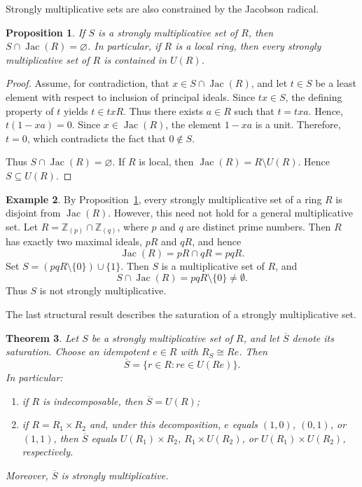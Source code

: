 \documentclass[11pt]{amsart}
\newtheorem{theorem}{Theorem}[section]
\newtheorem{proposition}[theorem]{Proposition}
\theoremstyle{definition}
\newtheorem{example}[theorem]{Example}
\theoremstyle{remark}
\newcommand{\Jac}{\operatorname{Jac}}
\begin{document}
Strongly multiplicative sets are also constrained by the Jacobson radical.

\begin{proposition}\label{prop:jac}
If $S$ is a strongly multiplicative set of $R$, then $S \cap \Jac(R)=\varnothing$. In particular, if $R$ is a local ring, then every strongly multiplicative set of $R$ is contained in $U(R)$.
\end{proposition}

\begin{proof}
Assume, for contradiction, that $x \in S \cap \Jac(R)$, and let $t \in S$ be a least element with respect to inclusion of principal ideals. Since $tx \in S$, the defining property of $t$ yields $t \in txR$. Thus there exists $a \in R$ such that
$t=txa.$
Hence, $t(1-xa)=0.$
Since $x \in \Jac(R)$, the element $1-xa$ is a unit. Therefore, $t=0$, which contradicts the fact that $0\notin S$.

Thus $S \cap \Jac(R)=\varnothing$. If $R$ is local, then $\Jac(R)=R\setminus U(R)$. Hence $S\subseteq U(R)$.
\end{proof}

\begin{example}
By Proposition~\ref{prop:jac}, every strongly multiplicative set of a ring $R$ is disjoint from $\Jac(R)$. However, this need not hold for a general multiplicative set. Let $R=\mathbb{Z}_{(p)}\cap \mathbb{Z}_{(q)}$, where $p$ and $q$ are distinct prime numbers. Then $R$ has exactly two maximal ideals, $pR$ and $qR$, and hence
\[
\Jac(R)=pR\cap qR=pqR.
\]
Set $S=(pqR\setminus\{0\})\cup\{1\}$. Then $S$ is a multiplicative set of $R$, and
\[
S\cap \Jac(R)=pqR\setminus\{0\}\neq\emptyset.
\]
Thus $S$ is not strongly multiplicative.
\end{example}

The last structural result describes the saturation of a strongly multiplicative set.

\begin{theorem}\label{thm:sat}
Let $S$ be a strongly multiplicative set of $R$, and let $\overline S$ denote its saturation.
Choose an idempotent $e \in R$ with $R_S \cong Re$.
Then
\[
\overline S=\{r \in R : re \in U(Re)\}.
\]
In particular:
\begin{enumerate}
\item if $R$ is indecomposable, then $\overline S=U(R)$;
\item if $R=R_1 \times R_2$ and, under this decomposition, $e$ equals $(1,0)$, $(0,1)$, or $(1,1)$, then $\overline S$ equals $U(R_1)\times R_2$, $R_1 \times U(R_2)$, or $U(R_1)\times U(R_2)$, respectively.
\end{enumerate}
Moreover, $\overline S$ is strongly multiplicative.
\end{theorem}
\end{document}
